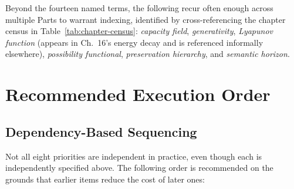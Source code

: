 \documentclass[11pt]{report}
\begin{document}
Beyond the fourteen named terms, the following recur often
enough across multiple Parts to warrant indexing, identified by
cross-referencing the chapter census in
Table~\ref{tab:chapter-census}: \textit{capacity field},
\textit{generativity}, \textit{Lyapunov function} (appears in
Ch.~16's energy decay and is referenced informally elsewhere),
\textit{possibility functional}, \textit{preservation
hierarchy}, and \textit{semantic horizon}.

\chapter{Recommended Execution Order}
\label{ch:sequencing}
\label{sec:sequencing}

\section{Dependency-Based Sequencing}

Not all eight priorities are independent in practice, even
though each is independently specified above. The following
order is recommended on the grounds that earlier items reduce
the cost of later ones:
\end{document}
